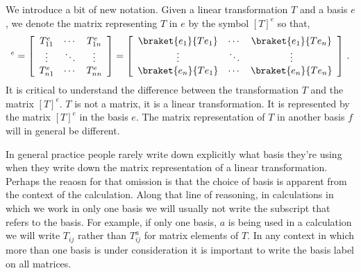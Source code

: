 We introduce a bit of new notation.
Given a linear transformation $T$ and a basis $e$, we denote the matrix representing $T$ in $e$ by the symbol $[T]^e$ so that,
\begin{displaymath}
  [T]^e =
  \left[ \begin{array}{ccc} T_{11}^e & \cdots & T_{1n}^e \\ \vdots & \ddots & \vdots \\ T_{n1}^e & \cdots & T_{nn}^e \end{array} \right]
  = \left[ \begin{array}{ccc} \braket{e_1}{Te_1} & \cdots & \braket{e_1}{Te_n} \\ \vdots & \ddots & \vdots \\ \braket{e_n}{Te_1} & \cdots & \braket{e_n}{Te_n} \end{array} \right]
  \, .
\end{displaymath}
It is critical to understand the difference between the transformation $T$ and the matrix $[T]^e$.
$T$ is not a matrix, it is a linear transformation.
It is represented by the matrix $[T]^e$ in the basis $e$.
The matrix representation of $T$ in another basis $f$ will in general be different.

In general practice people rarely write down explicitly what basis they're using when they write down the matrix representation of a linear transformation.
Perhaps the reaosn for that omission is that the choice of basis is apparent from the context of the calculation.
Along that line of reasoning, in calculations in which we work in only one basis we will usually not write the subscript that refers to the basis.
For example, if only one basis, $a$ is being used in a calculation we will write $T_{ij}$ rather than $T^a_{ij}$ for matrix elements of $T$.
In any context in which more than one basis is under consideration it is important to write the basis label on all matrices.

